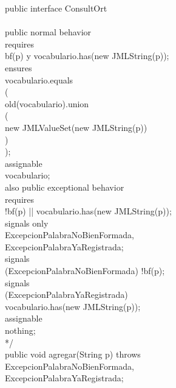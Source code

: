 \documentclass{article}
\begin{document}
public interface ConsultOrt \\
{\\
    
     public normal behavior \\
            requires \\
                bf(p) y vocabulario.has(new JMLString(p));\\
            ensures \\
                vocabulario.equals\\
                (\\
                    old(vocabulario).union\\
                    (\\
                         new JMLValueSet(new JMLString(p))\\
                    )\\
                );\\
            assignable\\ 
                vocabulario;\\		
       also public exceptional behavior\\
            requires \\
                !bf(p) || vocabulario.has(new JMLString(p));\\	
            signals only \\
                ExcepcionPalabraNoBienFormada,\\
		ExcepcionPalabraYaRegistrada;\\
	    signals \\
               (ExcepcionPalabraNoBienFormada) !bf(p);\\	
	    signals \\
                (ExcepcionPalabraYaRegistrada)\\ 
		    vocabulario.has(new JMLString(p));\\
	    assignable \\
                nothing;	\\		 
      */			\\
    public void agregar(String p) throws\\
        ExcepcionPalabraNoBienFormada,\\	 
	ExcepcionPalabraYaRegistrada;\\
		
}
\end{document}
